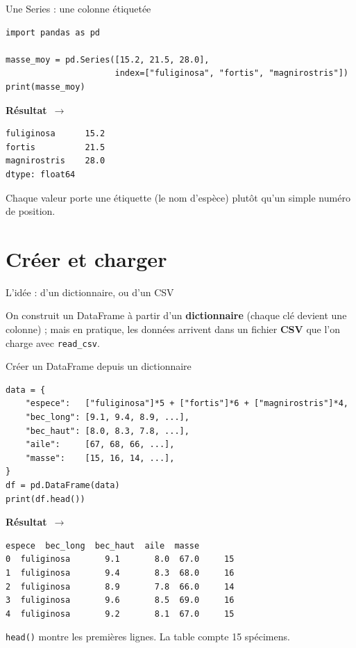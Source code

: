 \documentclass[aspectratio=169,11pt]{beamer}
\newcommand{\resultat}{{\scriptsize\textbf{R\'esultat}~$\rightarrow$}\par\vspace{1pt}}
\begin{document}
\begin{frame}[fragile]{Une Series : une colonne étiquetée}
\begin{lstlisting}
import pandas as pd

masse_moy = pd.Series([15.2, 21.5, 28.0],
                      index=["fuliginosa", "fortis", "magnirostris"])
print(masse_moy)
\end{lstlisting}
\resultat
\begin{lstlisting}[style=out]
fuliginosa      15.2
fortis          21.5
magnirostris    28.0
dtype: float64
\end{lstlisting}
{\small Chaque valeur porte une étiquette (le nom d'espèce) plutôt qu'un simple numéro de position.}
\end{frame}

\section{Créer et charger}

\begin{frame}{L'idée : d'un dictionnaire, ou d'un CSV}
\begin{ucaddef}
{\small On construit un DataFrame à partir d'un \textbf{dictionnaire} (chaque clé devient une colonne) ; mais en pratique, les données arrivent dans un fichier \textbf{CSV} que l'on charge avec \texttt{read\_csv}.}
\end{ucaddef}
\end{frame}

\begin{frame}[fragile]{Créer un DataFrame depuis un dictionnaire}
\begin{lstlisting}
data = {
    "espece":   ["fuliginosa"]*5 + ["fortis"]*6 + ["magnirostris"]*4,
    "bec_long": [9.1, 9.4, 8.9, ...],
    "bec_haut": [8.0, 8.3, 7.8, ...],
    "aile":     [67, 68, 66, ...],
    "masse":    [15, 16, 14, ...],
}
df = pd.DataFrame(data)
print(df.head())
\end{lstlisting}
\resultat
\begin{lstlisting}[style=out]
       espece  bec_long  bec_haut  aile  masse
0  fuliginosa       9.1       8.0  67.0     15
1  fuliginosa       9.4       8.3  68.0     16
2  fuliginosa       8.9       7.8  66.0     14
3  fuliginosa       9.6       8.5  69.0     16
4  fuliginosa       9.2       8.1  67.0     15
\end{lstlisting}
{\small \texttt{head()} montre les premières lignes. La table compte 15 spécimens.}
\end{frame}
\end{document}
